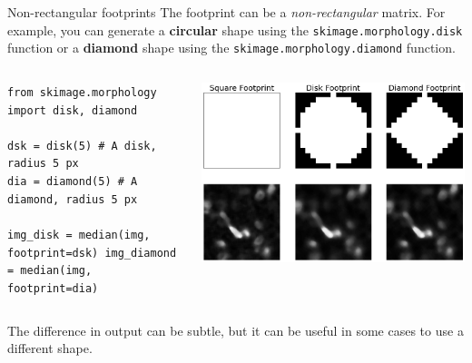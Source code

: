 \documentclass[9pt, aspectratio=169]{beamer}
\begin{document}
\begin{frame}
    {Non-rectangular footprints}
    The footprint can be a \textit{non-rectangular} matrix. For example, you can generate a \textbf{circular} shape using the \texttt{skimage.morphology.disk} function or a \textbf{diamond} shape using the \texttt{skimage.morphology.diamond} function.\\

    \vspace{2em}

    \begin{columns}
        \begin{column}{.57\textwidth}
            \begin{codebox}
                \texttt{from skimage.morphology import disk, diamond\\
                    \\
                    dsk = disk(5) \# A disk, radius 5 px\\
                    dia = diamond(5) \# A diamond, radius 5 px\\
                    \\
                    img\_disk = median(img, footprint=dsk)
                    img\_diamond = median(img, footprint=dia)
                }
            \end{codebox}
        \end{column}
        \begin{column}{.43\textwidth}
            \centering
            \includegraphics[width=\textwidth]{different_shaped_footprints.png}
        \end{column}
    \end{columns}
    The difference in output can be subtle, but it can be useful in some cases to use a different shape.
\end{frame}
\end{document}
